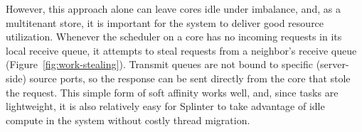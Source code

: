 However, this approach alone can leave cores idle under imbalance, and, as a multitenant
  store, it is important for the system to deliver good resource utilization.
Whenever the scheduler on a core has no
  incoming requests in its local receive queue, it attempts to steal requests
  from a neighbor's receive queue (Figure~\ref{fig:work-stealing}).
Transmit queues are not bound to specific (server-side) source ports, so the
  response can be sent directly from the core that stole the request.
This simple form of soft affinity works well, and, since tasks are lightweight,
  it is also relatively easy for Splinter to take advantage of idle compute
  in the system without costly thread migration.
